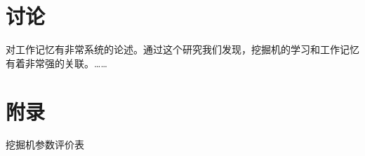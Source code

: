 \documentclass[UTF8,a4paper]{ctexart}
\begin{document}
\section{讨论}
对工作记忆有非常系统的论述。通过这个研究我们发现，挖掘机的学习和工作记忆有着非常强的关联。……


\renewcommand{\refname}{参考文献}


\clearpage
\section{附录}
挖掘机参数评价表
\end{document}
